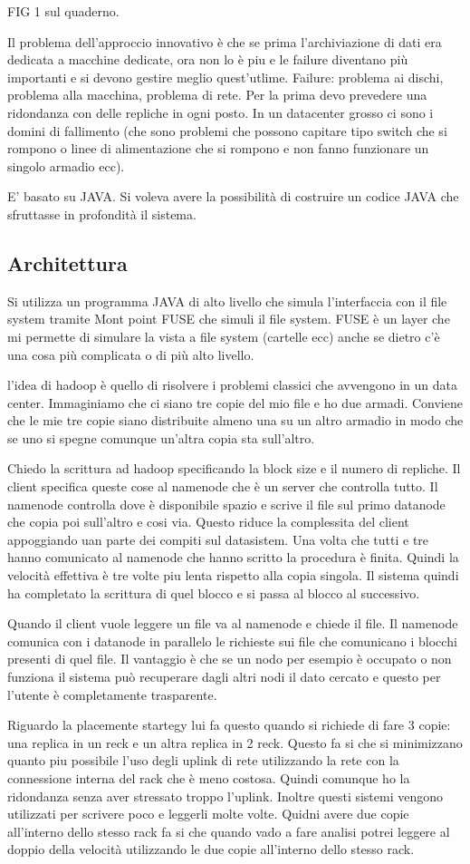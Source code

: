 \documentclass[italian,]{article}
\begin{document}
FIG 1 sul quaderno.

Il problema dell'approccio innovativo è che se prima l'archiviazione di
dati era dedicata a macchine dedicate, ora non lo è piu e le failure
diventano più importanti e si devono gestire meglio quest'utlime.
Failure: problema ai dischi, problema alla macchina, problema di rete.
Per la prima devo prevedere una ridondanza con delle repliche in ogni
posto. In un datacenter grosso ci sono i domini di fallimento (che sono
problemi che possono capitare tipo switch che si rompono o linee di
alimentazione che si rompono e non fanno funzionare un singolo armadio
ecc).

E' basato su JAVA. Si voleva avere la possibilità di costruire un codice
JAVA che sfruttasse in profondità il sistema. \subsection{Architettura}
Si utilizza un programma JAVA di alto livello che simula l'interfaccia
con il file system tramite Mont point FUSE che simuli il file system.
FUSE è un layer che mi permette di simulare la vista a file system
(cartelle ecc) anche se dietro c'è una cosa più complicata o di più alto
livello.

l'idea di hadoop è quello di risolvere i problemi classici che avvengono
in un data center. Immaginiamo che ci siano tre copie del mio file e ho
due armadi. Conviene che le mie tre copie siano distribuite almeno una
su un altro armadio in modo che se uno si spegne comunque un'altra copia
sta sull'altro.

Chiedo la scrittura ad hadoop specificando la block size e il numero di
repliche. Il client specifica queste cose al namenode che è un server
che controlla tutto. Il namenode controlla dove è disponibile spazio e
scrive il file sul primo datanode che copia poi sull'altro e cosi via.
Questo riduce la complessita del client appoggiando uan parte dei
compiti sul datasistem. Una volta che tutti e tre hanno comunicato al
namenode che hanno scritto la procedura è finita. Quindi la velocità
effettiva è tre volte piu lenta rispetto alla copia singola. Il sistema
quindi ha completato la scrittura di quel blocco e si passa al blocco al
successivo.

Quando il client vuole leggere un file va al namenode e chiede il file.
Il namenode comunica con i datanode in parallelo le richieste sui file
che comunicano i blocchi presenti di quel file. Il vantaggio è che se un
nodo per esempio è occupato o non funziona il sistema può recuperare
dagli altri nodi il dato cercato e questo per l'utente è completamente
trasparente.

Riguardo la placemente startegy lui fa questo quando si richiede di fare
3 copie: una replica in un reck e un altra replica in 2 reck. Questo fa
si che si minimizzano quanto piu possibile l'uso degli uplink di rete
utilizzando la rete con la connessione interna del rack che è meno
costosa. Quindi comunque ho la ridondanza senza aver stressato troppo
l'uplink. Inoltre questi sistemi vengono utilizzati per scrivere poco e
leggerli molte volte. Quidni avere due copie all'interno dello stesso
rack fa si che quando vado a fare analisi potrei leggere al doppio della
velocità utilizzando le due copie all'interno dello stesso rack.
\end{document}
